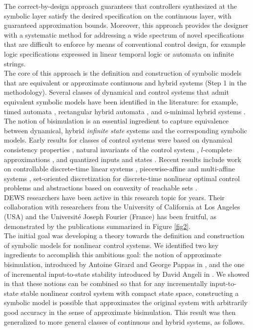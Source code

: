 \documentclass[submission,copyright,creativecommons]{eptcs}
\begin{document}
The correct-by-design approach guarantees that controllers synthesized at the symbolic layer satisfy the desired specification on the continuous layer, with guaranteed approximation bounds. Moreover, this approach provides the designer with a systematic method for addressing a wide spectrum of novel specifications that are difficult to enforce by means of conventional control design, for example logic specifications expressed in linear temporal logic or automata on infinite strings. \\

The core of this approach is the definition and construction of symbolic models that are equivalent or approximate continuous and hybrid systems (Step 1 in the methodology).
Several classes of dynamical and control systems that admit equivalent symbolic models have been identified in the literature: for example, timed automata \cite{alur}, rectangular hybrid automata \cite{puri}, and o-minimal hybrid systems \cite{lafferriere,brihaye}. The notion of bisimulation \cite{Milner,Park} is an essential ingredient to capture equivalence between dynamical, hybrid  \textit{infinite state} systems and the corresponding symbolic models. Early results for classes of control systems were based on dynamical consistency properties \cite{caines}, natural invariants of the control system \cite{koutsoukos}, $l$-complete approximations \cite{moor}, and quantized inputs and states \cite{forstner,BMP02}. Recent results include work on controllable discrete-time linear systems \cite{TabuadaLTL}, piecewise-affine and multi-affine systems \cite{habets,BH06}, set-oriented discretization  for discrete-time nonlinear optimal control problems \cite{junge1} and abstractions based on convexity of reachable sets \cite{gunther}. \\
DEWS researchers have been active in this research topic for years. Their collaboration with researchers from the University of California at Los Angeles (USA) and the Universit\'e Joseph Fourier (France) has been fruitful, as demonstrated by the publications summarized in Figure \ref{fig2}. \\
The initial goal was developing a theory towards the definition and construction of symbolic models for nonlinear control systems. We identified two key ingredients to accomplish this ambitious goal: the notion of approximate bisimulation, introduced by Antoine Girard and George Pappas in \cite{AB-TAC07}, and the one of incremental input-to-state stability introduced by David Angeli in \cite{IncrementalS}. We showed in \cite{PolaAutom2008} that these notions can be combined so that for any incrementally input-to-state stable nonlinear control system with compact state space, constructing a symbolic model is possible that approximates the original system with arbitrarily good accuracy in the sense of approximate bisimulation. This result was then generalized to more general classes of continuous and hybrid systems, as follows. \\
\end{document}
